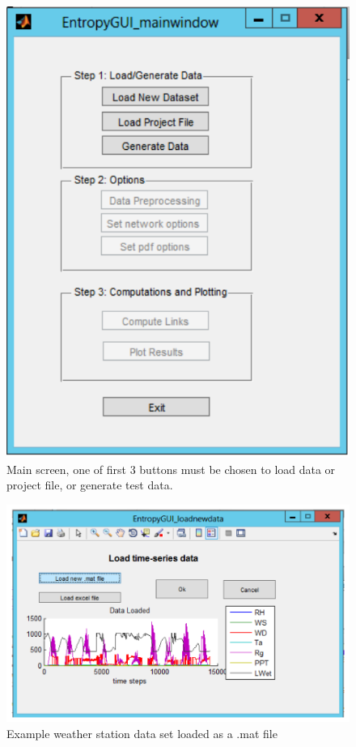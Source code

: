 \documentclass[a4paper]{article}
\begin{document}
\begin{figure}[h!]\label{fig:start}
\begin{center}
\includegraphics[scale=.5]{Image_PreLoad.pdf}
\caption{Main screen, one of first 3 buttons must be chosen to load data or project file, or generate test data.}
\end{center}
\end{figure}

\begin{figure}[h!]\label{fig:start}
\begin{center}
\includegraphics[scale=.5]{Image_LoadData.pdf}
\caption{Example weather station data set loaded as a .mat file}
\end{center}
\end{figure}
\end{document}
